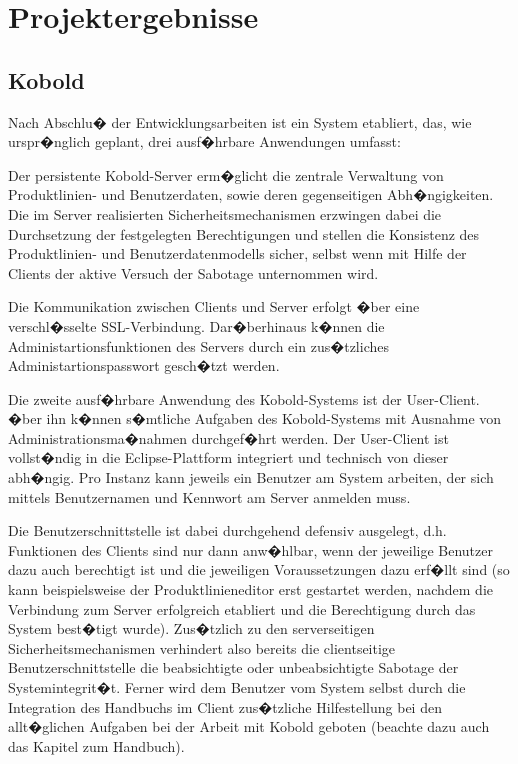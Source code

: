 \documentclass[a4paper,titlepage,12pt,ngerman]{scrbook}
\begin{document}
\chapter{Projektergebnisse}

\section{Kobold}

Nach Abschlu� der Entwicklungsarbeiten ist ein System etabliert, das, wie
urspr�nglich geplant, drei ausf�hrbare Anwendungen umfasst:\par

Der persistente Kobold-Server erm�glicht die zentrale Verwaltung von Produktlinien- 
und Benutzerdaten, sowie deren gegenseitigen Abh�ngigkeiten. Die im Server realisierten
Sicherheitsmechanismen erzwingen dabei die Durchsetzung der festgelegten Berechtigungen 
und stellen die Konsistenz des Produktlinien- und Benutzerdatenmodells sicher, selbst wenn
mit Hilfe der Clients der aktive Versuch der Sabotage unternommen wird.\par

Die Kommunikation zwischen Clients und Server erfolgt �ber eine verschl�sselte SSL-Verbindung.
Dar�berhinaus k�nnen die Administartionsfunktionen des Servers durch ein zus�tzliches Administartionspasswort
gesch�tzt werden.\par

Die zweite ausf�hrbare Anwendung des Kobold-Systems ist der User-Client. �ber ihn k�nnen
s�mtliche Aufgaben des Kobold-Systems mit Ausnahme von Administrationsma�nahmen durchgef�hrt werden.
Der User-Client ist vollst�ndig in die Eclipse-Plattform integriert und technisch von dieser
abh�ngig. Pro Instanz kann jeweils ein Benutzer am System arbeiten, der sich mittels Benutzernamen
und Kennwort am Server anmelden muss.\par

Die Benutzerschnittstelle ist dabei durchgehend defensiv ausgelegt, d.h. Funktionen des Clients sind nur 
dann anw�hlbar, wenn der jeweilige Benutzer dazu auch berechtigt ist und die jeweiligen Voraussetzungen dazu 
erf�llt sind (so kann beispielsweise der Produktlinieneditor erst gestartet werden, nachdem die Verbindung zum 
Server erfolgreich etabliert und die Berechtigung durch das System best�tigt wurde). Zus�tzlich zu den serverseitigen
Sicherheitsmechanismen verhindert also bereits die clientseitige Benutzerschnittstelle die beabsichtigte oder unbeabsichtigte
Sabotage der Systemintegrit�t. Ferner wird dem Benutzer vom System selbst durch die Integration des
Handbuchs im Client zus�tzliche Hilfestellung bei den allt�glichen Aufgaben bei der Arbeit mit Kobold geboten
(beachte dazu auch das Kapitel zum Handbuch).\par
 
\end{document}
